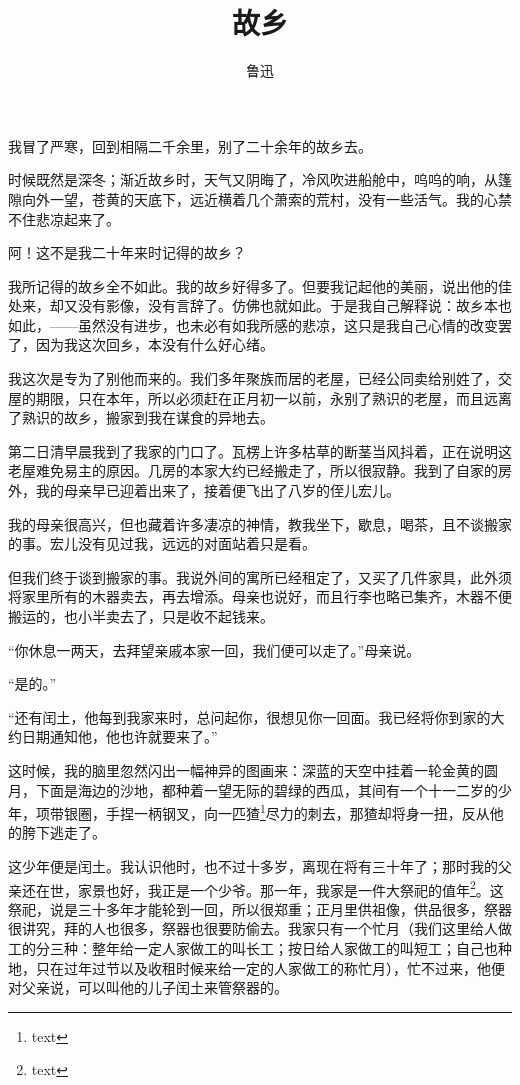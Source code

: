 \documentclass[12pt,UTF8]{ctexbook}
\title{\heiti\zihao{0} 故乡}
\author{鲁迅}
\date{}
\begin{document}
\maketitle
\tableofcontents

\frontmatter

我冒了严寒，回到相隔二千余里，别了二十余年的故乡去。

时候既然是深冬；渐近故乡时，天气又阴晦了，冷风吹进船舱中，呜呜的响，从篷隙向外一望，苍黄的天底下，远近横着几个萧索的荒村，没有一些活气。我的心禁不住悲凉起来了。

阿！这不是我二十年来时记得的故乡？

我所记得的故乡全不如此。我的故乡好得多了。但要我记起他的美丽，说出他的佳处来，却又没有影像，没有言辞了。仿佛也就如此。于是我自己解释说：故乡本也如此，——虽然没有进步，也未必有如我所感的悲凉，这只是我自己心情的改变罢了，因为我这次回乡，本没有什么好心绪。

我这次是专为了别他而来的。我们多年聚族而居的老屋，已经公同卖给别姓了，交屋的期限，只在本年，所以必须赶在正月初一以前，永别了熟识的老屋，而且远离了熟识的故乡，搬家到我在谋食的异地去。

第二日清早晨我到了我家的门口了。瓦楞上许多枯草的断茎当风抖着，正在说明这老屋难免易主的原因。几房的本家大约已经搬走了，所以很寂静。我到了自家的房外，我的母亲早已迎着出来了，接着便飞出了八岁的侄儿宏儿。

我的母亲很高兴，但也藏着许多凄凉的神情，教我坐下，歇息，喝茶，且不谈搬家的事。宏儿没有见过我，远远的对面站着只是看。

但我们终于谈到搬家的事。我说外间的寓所已经租定了，又买了几件家具，此外须将家里所有的木器卖去，再去增添。母亲也说好，而且行李也略已集齐，木器不便搬运的，也小半卖去了，只是收不起钱来。

“你休息一两天，去拜望亲戚本家一回，我们便可以走了。”母亲说。

“是的。”

“还有闰土，他每到我家来时，总问起你，很想见你一回面。我已经将你到家的大约日期通知他，他也许就要来了。”

这时候，我的脑里忽然闪出一幅神异的图画来：深蓝的天空中挂着一轮金黄的圆月，下面是海边的沙地，都种着一望无际的碧绿的西瓜，其间有一个十一二岁的少年，项带银圈，手捏一柄钢叉，向一匹猹\footnote{text}尽力的刺去，那猹却将身一扭，反从他的胯下逃走了。

这少年便是闰土。我认识他时，也不过十多岁，离现在将有三十年了；那时我的父亲还在世，家景也好，我正是一个少爷。那一年，我家是一件大祭祀的值年\footnote{text}。这祭祀，说是三十多年才能轮到一回，所以很郑重；正月里供祖像，供品很多，祭器很讲究，拜的人也很多，祭器也很要防偷去。我家只有一个忙月（我们这里给人做工的分三种：整年给一定人家做工的叫长工；按日给人家做工的叫短工；自己也种地，只在过年过节以及收租时候来给一定的人家做工的称忙月），忙不过来，他便对父亲说，可以叫他的儿子闰土来管祭器的。
\end{document}
